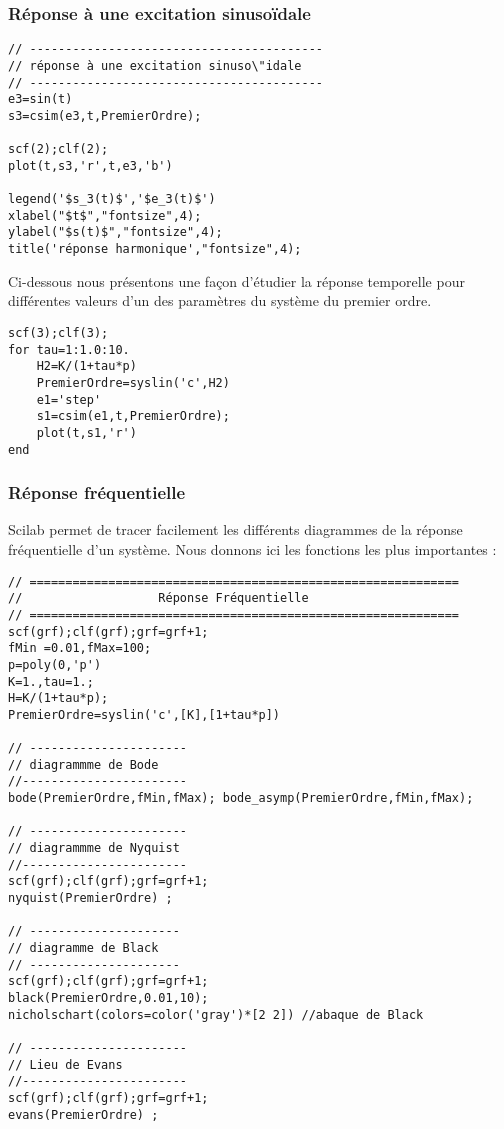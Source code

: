 \subsubsection{Réponse à une excitation sinuso\"idale}
\begin{code}
\begin{verbatim}
// -----------------------------------------
// réponse à une excitation sinuso\"idale 
// -----------------------------------------
e3=sin(t)
s3=csim(e3,t,PremierOrdre);

scf(2);clf(2);
plot(t,s3,'r',t,e3,'b')

legend('$s_3(t)$','$e_3(t)$')
xlabel("$t$","fontsize",4);
ylabel("$s(t)$","fontsize",4); 
title('réponse harmonique',"fontsize",4);
\end{verbatim}
\end{code}

Ci-dessous nous présentons une façon d'étudier la réponse temporelle pour
différentes valeurs d'un des paramètres du système du premier ordre.
\begin{code}
\begin{verbatim}
scf(3);clf(3);
for tau=1:1.0:10.
    H2=K/(1+tau*p)
    PremierOrdre=syslin('c',H2)
    e1='step'
    s1=csim(e1,t,PremierOrdre);
    plot(t,s1,'r')
end
\end{verbatim}
\end{code}


\subsubsection{Réponse fréquentielle}
Scilab permet de tracer facilement les différents diagrammes de la réponse fréquentielle d'un système.
Nous donnons ici les fonctions les plus importantes : 
\begin{code}
\begin{verbatim}
// ============================================================
//                   Réponse Fréquentielle
// ============================================================
scf(grf);clf(grf);grf=grf+1;
fMin =0.01,fMax=100;
p=poly(0,'p')
K=1.,tau=1.;
H=K/(1+tau*p);
PremierOrdre=syslin('c',[K],[1+tau*p])

// ----------------------
// diagrammme de Bode
//-----------------------
bode(PremierOrdre,fMin,fMax); bode_asymp(PremierOrdre,fMin,fMax);

// ----------------------
// diagrammme de Nyquist
//-----------------------
scf(grf);clf(grf);grf=grf+1;
nyquist(PremierOrdre) ;

// ---------------------
// diagramme de Black
// ---------------------
scf(grf);clf(grf);grf=grf+1;
black(PremierOrdre,0.01,10);
nicholschart(colors=color('gray')*[2 2]) //abaque de Black

// ----------------------
// Lieu de Evans
//-----------------------
scf(grf);clf(grf);grf=grf+1;
evans(PremierOrdre) ;
\end{verbatim}
\end{code}


